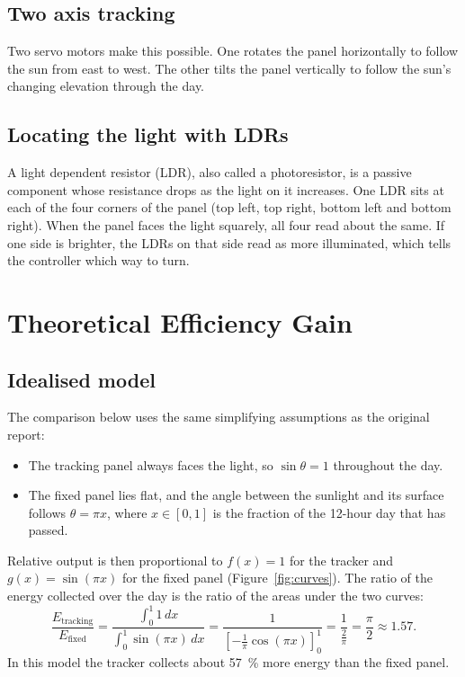 \documentclass[11pt,a4paper]{article}
\begin{document}
\subsection{Two axis tracking}
Two servo motors make this possible. One rotates the panel horizontally to follow the sun from east to west. The other tilts the panel vertically to follow the sun's changing elevation through the day.

\subsection{Locating the light with LDRs}
A light dependent resistor (LDR), also called a photoresistor, is a passive component whose resistance drops as the light on it increases. One LDR sits at each of the four corners of the panel (top left, top right, bottom left and bottom right). When the panel faces the light squarely, all four read about the same. If one side is brighter, the LDRs on that side read as more illuminated, which tells the controller which way to turn.

\section{Theoretical Efficiency Gain}
\label{sec:theory}

\subsection{Idealised model}
The comparison below uses the same simplifying assumptions as the original report:
\begin{itemize}[nosep]
  \item The tracking panel always faces the light, so $\sin\theta=1$ throughout the day.
  \item The fixed panel lies flat, and the angle between the sunlight and its surface follows $\theta=\pi x$, where $x\in[0,1]$ is the fraction of the \num{12}-hour day that has passed.
\end{itemize}
Relative output is then proportional to $f(x)=1$ for the tracker and $g(x)=\sin(\pi x)$ for the fixed panel (Figure~\ref{fig:curves}). The ratio of the energy collected over the day is the ratio of the areas under the two curves:
\begin{equation}
  \frac{E_{\text{tracking}}}{E_{\text{fixed}}}
  = \frac{\int_0^1 1\,dx}{\int_0^1 \sin(\pi x)\,dx}
  = \frac{1}{\left[-\tfrac{1}{\pi}\cos(\pi x)\right]_0^1}
  = \frac{1}{\tfrac{2}{\pi}}
  = \frac{\pi}{2}\approx 1.57 .
\end{equation}
In this model the tracker collects about \SI{57}{\percent} more energy than the fixed panel.
\end{document}
